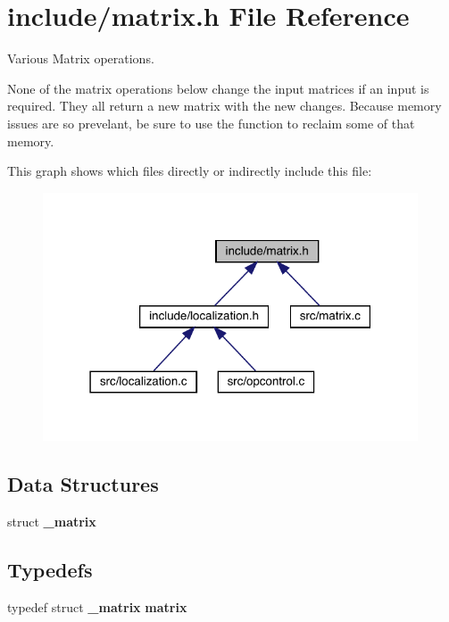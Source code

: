 \section{include/matrix.h File Reference}
\label{matrix_8h}


Various Matrix operations.

None of the matrix operations below change the input matrices if an input is required. They all return a new matrix with the new changes. Because memory issues are so prevelant, be sure to use the  function to reclaim some of that memory.  


This graph shows which files directly or indirectly include this file\+:\nopagebreak
\begin{figure}[H]
\begin{center}
\leavevmode
\includegraphics[width=315pt]{matrix_8h__dep__incl}
\end{center}
\end{figure}
\subsection*{Data Structures}
\begin{DoxyCompactItemize}
\item 
struct \textbf{ \+\_\+matrix}
\end{DoxyCompactItemize}
\subsection*{Typedefs}
\begin{DoxyCompactItemize}
\item 
typedef struct \textbf{ \+\_\+matrix} \textbf{ matrix}
\end{DoxyCompactItemize}
